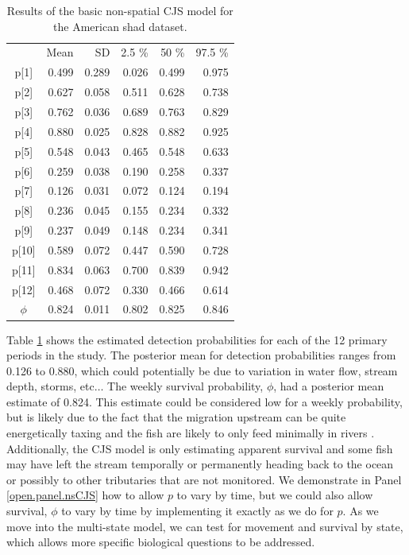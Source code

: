\begin{table}
\centering
\caption{Results of the basic non-spatial CJS model for the American shad dataset.
}
\begin{tabular}{crrrrr}
\hline \hline
&    Mean   &  SD  &  2.5 \%   &   50 \%    &  97.5 \% \\
p[1] & 0.499 & 0.289 & 0.026 & 0.499 & 0.975 \\
p[2] & 0.627 & 0.058 & 0.511 & 0.628 & 0.738 \\
p[3] & 0.762 & 0.036 & 0.689 & 0.763 & 0.829 \\
p[4] & 0.880 & 0.025 & 0.828 & 0.882 & 0.925 \\
p[5] & 0.548 & 0.043 & 0.465 & 0.548 & 0.633 \\
p[6] & 0.259 & 0.038 & 0.190 & 0.258 & 0.337 \\
p[7] & 0.126 & 0.031 & 0.072 & 0.124 & 0.194 \\
p[8] & 0.236 & 0.045 & 0.155 & 0.234 & 0.332 \\
p[9] & 0.237 & 0.049 & 0.148 & 0.234 & 0.341 \\
p[10]& 0.589 & 0.072 & 0.447 & 0.590 & 0.728  \\
p[11]& 0.834 & 0.063 & 0.700 & 0.839 & 0.942 \\
p[12]& 0.468 & 0.072 & 0.330 & 0.466 & 0.614 \\
$\phi$  & 0.824 & 0.011 & 0.802 & 0.825 & 0.846 \\
\hline
\end{tabular}
\label{open.tab.simple-shad}
\end{table}

Table \ref{open.tab.simple-shad} shows the estimated detection
probabilities for each of the 12 primary periods in the study.  The
posterior mean for detection probabilities ranges from 0.126 to 0.880,
which could potentially be due to variation in water flow, stream
depth, storms, etc$\dots$ The weekly survival probability, $\phi$, had
a posterior mean estimate of 0.824.  This estimate could be considered
low for a weekly probability, but is likely due to the fact that the
migration upstream can be quite energetically taxing and the fish are
likely to only feed minimally in
rivers \citep{leggett_carscadden:1978, leonard_mccormick:1999}.
Additionally, the CJS model is only estimating apparent survival and
some fish may have left the stream temporally or permanently heading
back to the ocean or possibly to other tributaries that are not
monitored.   We demonstrate in Panel \ref{open.panel.nsCJS} how to
allow $p$ to vary by time, but we could also allow survival, $\phi$ to
vary by time by implementing it exactly as we do for $p$.  As we move into
the multi-state model, we can test for movement and survival by state,
which allows more specific biological questions to be addressed.


